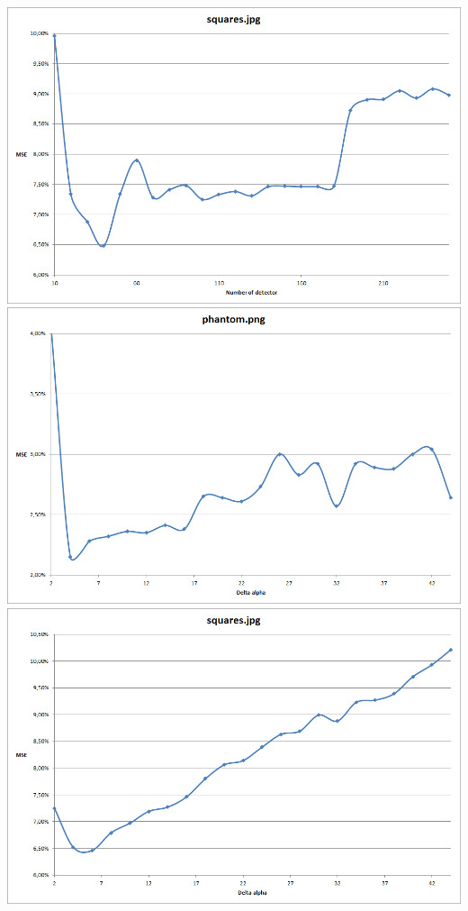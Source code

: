 \documentclass[a4paper,11pt]{article}
\begin{document}
\includegraphics[width=\textwidth]{squaresDetectors}
\includegraphics[width=\textwidth]{phantomAlpha}
\includegraphics[width=\textwidth]{squaresAlpha}
\end{document}
